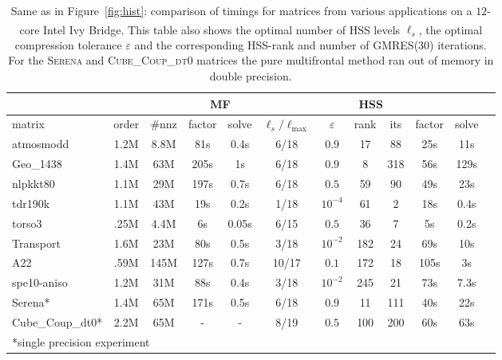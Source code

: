 \documentclass{article}
\newcommand{\tm}{\textsuperscript{\textregistered}}
\begin{document}
\begin{table}\footnotesize
  \renewcommand{\arraystretch}{1}
  \setlength{\tabcolsep}{0.20em}
  \newcommand{\ce}[1]{\multicolumn{1}{c|}{#1}}
  \newcommand{\cee}[1]{\multicolumn{1}{c|}{#1}}
  \begin{center}
    \begin{tabular}{|l||c|c||c|c||c|c|c|c|c|c|c|}
      \cline{4-11}
      \multicolumn{3}{c||}{} & \multicolumn{2}{|c||}{MF} & \multicolumn{6}{|c|}{HSS} \\
      \hline
      matrix     &  order & \#nnz & factor & solve  & $\ell_s / \ell_{\textrm{max}}$ & $\varepsilon$ & rank & its & factor & solve \\
      \hline  \hline
      atmosmodd  & 1.2M   & 8.8M    & 81s    & 0.4s   & 6/18  & $0.9$    & 17  & 88  & 25s   & 11s   \\
      \hline
      Geo\_1438  & 1.4M   & 63M   & 205s   & 1s     & 6/18  & $0.9$    & 8    & 318 & 56s   & 129s  \\
      \hline
      nlpkkt80   & 1.1M   & 29M   & 197s   & 0.7s   & 6/18  & $0.5$    & 59   & 90  & 49s   & 23s   \\
      \hline
      tdr190k    & 1.1M   & 43M   & 19s    & 0.2s   & 1/18  & $10^{-4}$ & 61   &  2 & 18s   & 0.4s  \\
      \hline
      torso3     & .25M   & 4.4M    & 6s     & 0.05s  & 6/15  & $0.5$   & 36  &  7 & 5s    & 0.2s  \\
      \hline
      Transport  & 1.6M   & 23M   & 80s    & 0.5s   & 3/18  & $10^{-2}$ & 182  & 24 & 69s   & 10s   \\
      \hline
      A22        & .59M   & 145M  & 127s   & 0.7s   & 10/17 & $0.1$    & 172  & 18 & 105s  & 3s    \\
      \hline
      spe10-aniso & 1.2M  & 31M   & 88s    & 0.4s   & 3/18  & $10^{-2}$ & 245  & 21 & 73s  & 7.3s    \\
      \hline
      Serena*     & 1.4M  & 65M   & 171s   & 0.5s   & 6/18  & $0.9$    & 11   & 111  & 40s  & 22s    \\
      \hline
      Cube\_Coup\_dt0* & 2.2M & 65M & -     & -      & 8/19  & $0.5$    & 100  & 200  & 60s  & 63s \\
      \hline
      \multicolumn{3}{l}{*single precision experiment}
    \end{tabular}
  \end{center}
  \caption{\footnotesize Same as in Figure~\ref{fig:hist}: comparison of timings for matrices from various
    applications on a $12$-core Intel\tm{} Ivy Bridge. This table also shows the optimal 
    number of HSS levels $\ell_s$, the optimal compression tolerance $\varepsilon$ and
    the corresponding HSS-rank and number of GMRES($30$) iterations.
    For the \textsc{Serena} and \textsc{Cube\_Coup\_dt0} matrices the pure multifrontal
    method ran out of memory in double precision. }
  \label{tab:matrix_list}
\end{table}
\end{document}
